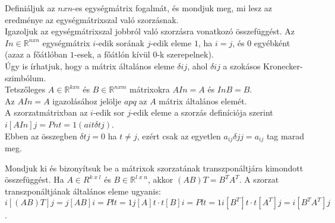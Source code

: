 \begin{frame}
  \begin{tcolorbox}[title={7. (4p)}]
      Definiáljuk az $n x n$-es egységmátrix fogalmát, és mondjuk meg, mi lesz az eredménye az egységmátrixszal való szorzásnak.\\
      
      Igazoljuk az egységmátrixszal jobbról való szorzásra vonatkozó összefüggést. 
  \tcblower
    Az $In \in \mathbb{R}^{n x n}$ egységmátrix $i$-edik sorának $j$-edik eleme $1$, ha $i = j$, és $0$ egyébként (azaz a főátlóban $1$-esek, a főátlón kívül $0$-k szerepelnek).\\
    
    Úgy is írhatjuk, hogy a mátrix általános eleme ${\delta}ij$, ahol ${\delta}ij$ a szokásos Kronecker-szimbólum.\\
    
    Tetszőleges $A \in \mathbb{R}^{k x n}$ és $B \in \mathbb{R}^{n x m}$ mátrixokra $AIn = A$ és $InB = B$.\\
    
    Az $AIn = A$ igazolásához jelölje $apq$ az $A$ mátrix általános elemét.\\
    
    A szorzatmátrixban az $i$-edik sor $j$-edik eleme a szorzás definíciója szerint $i[AIn]j = Pn t=1(ait{\delta}tj)$.\\
    
    Ebben az összegben ${\delta}tj = 0$ ha $t \neq j$, ezért csak az egyetlen $a_{ij}{\delta}jj = a_{ij}$ tag marad meg.
  \end{tcolorbox}
\end{frame}


\begin{frame}
  \begin{tcolorbox}[title={8. (4p)}]
       Mondjuk ki és bizonyítsuk be a mátrixok szorzatának transzponáltjára kimondott összefüggést. 
  \tcblower
    Ha $A \in R^{k \; x \; l}$ és $B \in \mathbb{R}^{l \; x \; n}$, akkor $(AB)T = B^TA^T$. A szorzat transzponáltjának általános eleme ugyanis: $i[(AB)T]j = j[AB]i = Pl t=1 j[A]t  \cdot  t[B]i = Pl t=1 i[B^T]t  \cdot  t[A^T]j = i[B^TA^T]j$.
  \end{tcolorbox}
\end{frame}

